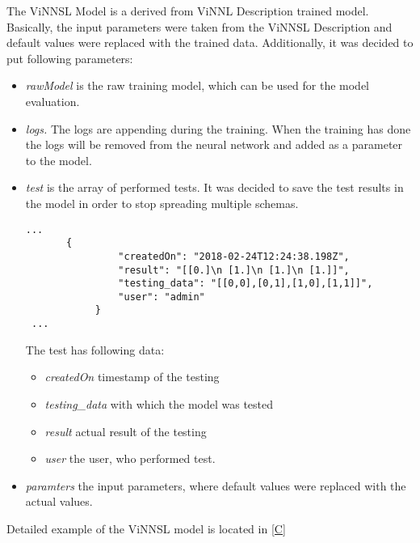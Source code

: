 The ViNNSL Model is a derived from ViNNL Description trained model. Basically, the input parameters were taken from the ViNNSL Description and default values were replaced with the trained data. Additionally, it was decided to put following parameters:

\begin{itemize}
\item \emph{rawModel} is the raw training model, which can be used for the model evaluation. 
\item \emph{logs.} The logs are appending during the training. When the training has done the logs will be removed from the neural network and added as a parameter to the model.
\item \emph{test} is the array of performed tests. It was decided to save the test results in the model in order to stop spreading multiple schemas. 
 \begin{lstlisting}[caption=ViNNSL trained model testing]
...
       {
                "createdOn": "2018-02-24T12:24:38.198Z",
                "result": "[[0.]\n [1.]\n [1.]\n [1.]]",
                "testing_data": "[[0,0],[0,1],[1,0],[1,1]]",
                "user": "admin"
            }
 ...
\end{lstlisting}
The test has following data:
\begin{itemize}
\item \emph{createdOn} timestamp of the testing
\item \emph{testing\_data} with which the model was tested
\item \emph{result} actual result of the testing
\item \emph{user} the user, who performed test.
\end{itemize}
\item \emph{paramters} the input parameters, where default values were replaced with the actual values. 
\end{itemize}

Detailed example of the ViNNSL model is located in \autoref{C}
